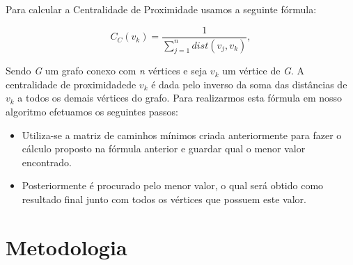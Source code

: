\documentclass[12pt]{article}
\begin{document}
Para calcular a Centralidade de Proximidade usamos a seguinte fórmula:
\begin{center}
\begin{equation}
C_C(v_k)=\frac{1}{\sum\limits_{j = 1}^n dist(v_j,v_k)},
\end{equation}
\end{center}
Sendo {\it G} um grafo conexo com {\it n} vértices e seja $v_k$ um vértice de {\it G}. A centralidade de proximidadede $v_k$ é dada pelo inverso da soma das distâncias de $v_k$ a todos os demais vértices do grafo.
    Para realizarmos esta fórmula em nosso algoritmo efetuamos os seguintes passos:
\begin{itemize}
\item Utiliza-se a matriz de caminhos mínimos criada anteriormente para fazer o cálculo proposto na fórmula anterior e guardar qual o menor valor encontrado.
\item Posteriormente é procurado pelo menor valor, o qual será obtido como resultado final junto com todos os vértices que possuem este valor.
\end{itemize}

\section{Metodologia}\label{sec:met}
\end{document}
